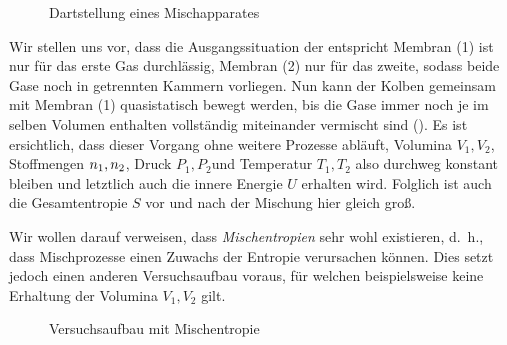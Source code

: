 \begin{figure}[htbp]
    \centering
    \begin{subfigure}[b]{.45\textwidth}
        \centering
        \tfigMixingMachineOne        
        \caption{}
        \label{fig:MixingMachineOne}
    \end{subfigure}
    \begin{subfigure}[b]{.45\textwidth}
        \centering
        \tfigMixingMachineTwo           
        \caption{}
        \label{fig:MixingMachineTwo}
    \end{subfigure}
    \caption{Dartstellung eines Mischapparates}
    \label{fig:MixingMaschine}
\end{figure}
Wir stellen uns vor, dass die Ausgangssituation der  entspricht \textendash{} Membran (1) ist nur für das erste Gas durchlässig, Membran (2) nur für das zweite, sodass beide Gase noch in getrennten Kammern vorliegen. Nun kann der Kolben gemeinsam mit
Membran (1) quasistatisch%
bewegt werden, bis die Gase \textendash{} immer noch je im selben Volumen enthalten \textendash{} vollständig miteinander vermischt sind (). Es ist ersichtlich, dass dieser Vorgang ohne weitere Prozesse abläuft, Volumina $V_1,V_2$, Stoffmengen $n _1,n _2$, Druck $P_1,P_2$und Temperatur $T_1,T_2$ also durchweg konstant bleiben und letztlich auch die innere Energie $U$ erhalten wird. Folglich ist auch die Gesamtentropie $S$ vor und nach der Mischung hier gleich groß.

Wir wollen darauf verweisen, dass \emph{Mischentropien} sehr wohl existieren, d.~h., dass Mischprozesse einen Zuwachs der Entropie verursachen können. Dies setzt jedoch einen anderen Versuchsaufbau voraus, für welchen beispielsweise keine Erhaltung der Volumina $V_1,V_2$ gilt. 
\begin{figure}[htbp]
    \centering
    \tfigMixTwoGases
    \caption{Versuchsaufbau mit Mischentropie}
    \label{fig:MixTwoGases}
\end{figure}

